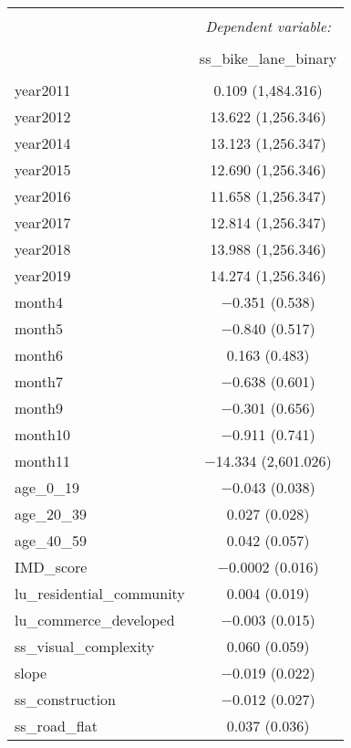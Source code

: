 \begin{table}[!htbp] \centering 
  \caption{} 
  \label{} 
\small 
\begin{tabular}{@{\extracolsep{1pt}}lc} 
\\[-1.8ex]\hline 
\hline \\[-1.8ex] 
 & \multicolumn{1}{c}{\textit{Dependent variable:}} \\ 
\cline{2-2} 
\\[-1.8ex] & ss\_bike\_lane\_binary \\ 
\hline \\[-1.8ex] 
 year2011 & 0.109 (1,484.316) \\ 
  year2012 & 13.622 (1,256.346) \\ 
  year2014 & 13.123 (1,256.347) \\ 
  year2015 & 12.690 (1,256.346) \\ 
  year2016 & 11.658 (1,256.347) \\ 
  year2017 & 12.814 (1,256.347) \\ 
  year2018 & 13.988 (1,256.346) \\ 
  year2019 & 14.274 (1,256.346) \\ 
  month4 & $-$0.351 (0.538) \\ 
  month5 & $-$0.840 (0.517) \\ 
  month6 & 0.163 (0.483) \\ 
  month7 & $-$0.638 (0.601) \\ 
  month9 & $-$0.301 (0.656) \\ 
  month10 & $-$0.911 (0.741) \\ 
  month11 & $-$14.334 (2,601.026) \\ 
  age\_0\_19 & $-$0.043 (0.038) \\ 
  age\_20\_39 & 0.027 (0.028) \\ 
  age\_40\_59 & 0.042 (0.057) \\ 
  IMD\_score & $-$0.0002 (0.016) \\ 
  lu\_residential\_community & 0.004 (0.019) \\ 
  lu\_commerce\_developed & $-$0.003 (0.015) \\ 
  ss\_visual\_complexity & 0.060 (0.059) \\ 
  slope & $-$0.019 (0.022) \\ 
  ss\_construction & $-$0.012 (0.027) \\ 
  ss\_road\_flat & 0.037 (0.036) \\ 

\end{tabular}
\end{table}
